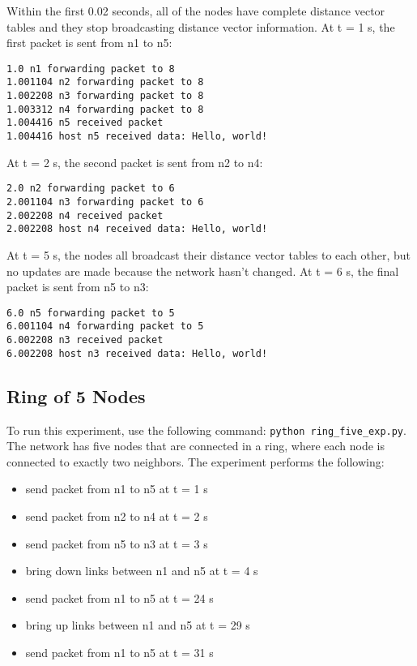 \documentclass[11pt]{article}
\newcommand{\code}[1]{\texttt{#1}}
\begin{document}
Within the first 0.02 seconds, all of the nodes have complete distance vector tables and they stop broadcasting distance vector information. At t = 1 s, the first packet is sent from n1 to n5:

\begin{lstlisting}
1.0 n1 forwarding packet to 8
1.001104 n2 forwarding packet to 8
1.002208 n3 forwarding packet to 8
1.003312 n4 forwarding packet to 8
1.004416 n5 received packet
1.004416 host n5 received data: Hello, world!
\end{lstlisting}

At t = 2 s, the second packet is sent from n2 to n4:

\begin{lstlisting}
2.0 n2 forwarding packet to 6
2.001104 n3 forwarding packet to 6
2.002208 n4 received packet
2.002208 host n4 received data: Hello, world!
\end{lstlisting}

At t = 5 s, the nodes all broadcast their distance vector tables to each other, but no updates are made because the network hasn't changed. At t = 6 s, the final packet is sent from n5 to n3:

\begin{lstlisting}
6.0 n5 forwarding packet to 5
6.001104 n4 forwarding packet to 5
6.002208 n3 received packet
6.002208 host n3 received data: Hello, world!
\end{lstlisting}

\subsection{Ring of 5 Nodes}
To run this experiment, use the following command: \code{python ring\_five\_exp.py}. The network has five nodes that are connected in a ring, where each node is connected to exactly two neighbors. The experiment performs the following:
\begin{itemize}
	\item send packet from n1 to n5 at t = 1 s
	\item send packet from n2 to n4 at t = 2 s
	\item send packet from n5 to n3 at t = 3 s
	\item bring down links between n1 and n5 at t = 4 s
	\item send packet from n1 to n5 at t = 24 s
	\item bring up links between n1 and n5 at t = 29 s
	\item send packet from n1 to n5 at t = 31 s
\end{itemize}
\end{document}

